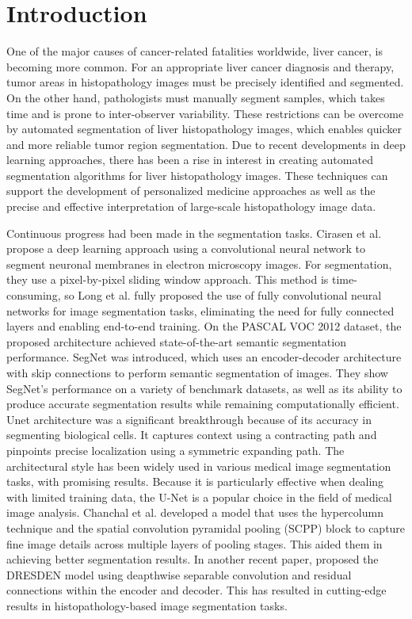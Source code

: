 \section{Introduction} 

One of the major causes of cancer-related fatalities worldwide, liver cancer, is becoming more common. For an appropriate liver cancer diagnosis and therapy, tumor areas in histopathology images must be precisely identified and segmented. On the other hand, pathologists must manually segment samples, which takes time and is prone to inter-observer variability. These restrictions can be overcome by automated segmentation of liver histopathology images, which enables quicker and more reliable tumor region segmentation. Due to recent developments in deep learning approaches, there has been a rise in interest in creating automated segmentation algorithms for liver histopathology images. These techniques can support the development of personalized medicine approaches as well as the precise and effective interpretation of large-scale histopathology image data.


Continuous progress had been made in the segmentation tasks. Cirasen et al. \cite{ciresan2012deep} propose a deep learning approach using a convolutional neural network to segment neuronal membranes in electron microscopy images. For segmentation, they use a pixel-by-pixel sliding window approach. This method is time-consuming, so Long et al. \cite{shelhamer2016fully} fully proposed the use of fully convolutional neural networks for image segmentation tasks, eliminating the need for fully connected layers and enabling end-to-end training. On the PASCAL VOC 2012 dataset, the proposed architecture achieved state-of-the-art semantic segmentation performance.
SegNet \cite{badrinarayanan2015segnet} was introduced, which uses an encoder-decoder architecture with skip connections to perform semantic segmentation of images. They show SegNet's performance on a variety of benchmark datasets, as well as its ability to produce accurate segmentation results while remaining computationally efficient. Unet architecture \cite{DBLP:journals/corr/RonnebergerFB15} was a significant breakthrough because of its accuracy in segmenting biological cells. It captures context using a contracting path and pinpoints precise localization using a symmetric expanding path.
The architectural style has been widely used in various medical image segmentation tasks, with promising results. Because it is particularly effective when dealing with limited training data, the U-Net is a popular choice in the field of medical image analysis. Chanchal et al. \cite{chanchal2021efficient} developed a model that uses the hypercolumn technique and the spatial convolution pyramidal pooling (SCPP) block to capture fine image details across multiple layers of pooling stages. This aided them in achieving better segmentation results. In another recent paper, \cite{chanchal2022deep} proposed the DRESDEN model using deapthwise separable convolution and residual connections within the encoder and decoder. This has resulted in cutting-edge results in histopathology-based image segmentation tasks.

